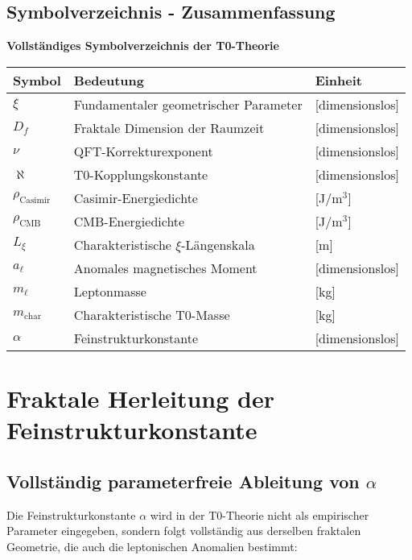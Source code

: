\documentclass[12pt,a4paper]{article}
\newcommand{\nulep}{\nu}
\newcommand{\mchar}{m_{\text{char}}}
\theoremstyle{remark}
\begin{document}
\begin{summary}
	\subsection{Symbolverzeichnis - Zusammenfassung}
	
	\begin{center}
		\textbf{Vollständiges Symbolverzeichnis der T0-Theorie}
		\vspace{0.5em}
		
		\begin{tabular}{lll}
			\toprule
			\textbf{Symbol} & \textbf{Bedeutung} & \textbf{Einheit} \\
			\midrule
			$\xi$ & Fundamentaler geometrischer Parameter & [dimensionslos] \\
			$D_f$ & Fraktale Dimension der Raumzeit & [dimensionslos] \\
			$\nulep$ & QFT-Korrekturexponent & [dimensionslos] \\
			$\aleph$ & T0-Kopplungskonstante & [dimensionslos] \\
			$\rho_{\text{Casimir}}$ & Casimir-Energiedichte & [J/m$^3$] \\
			$\rho_{\text{CMB}}$ & CMB-Energiedichte & [J/m$^3$] \\
			$L_\xi$ & Charakteristische $\xi$-Längenskala & [m] \\
			$a_\ell$ & Anomales magnetisches Moment & [dimensionslos] \\
			$m_\ell$ & Leptonmasse & [kg] \\
			$\mchar$ & Charakteristische T0-Masse & [kg] \\
			$\alpha$ & Feinstrukturkonstante & [dimensionslos] \\
			\bottomrule
		\end{tabular}
	\end{center}
\end{summary}

\section{Fraktale Herleitung der Feinstrukturkonstante}

\subsection{Vollständig parameterfreie Ableitung von $\alpha$}

Die Feinstrukturkonstante $\alpha$ wird in der T0-Theorie nicht als empirischer Parameter eingegeben, sondern folgt vollständig aus derselben fraktalen Geometrie, die auch die leptonischen Anomalien bestimmt:
\end{document}
